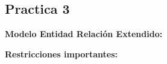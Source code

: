 \documentclass{report}
\begin{document}
	
	
	
	\begin{center}
		\section*{\LARGE{Practica 3}}
	\end{center}
    \begin{center}
        \LARGE{\textbf{Modelo Entidad Relación Extendido:}}\\
    \end{center}
    \normalsize
    

    \begin{center}
        \LARGE{\textbf{Restricciones importantes:}}\\
    \end{center}
    \normalsize

    
    \newpage
    
\printbibliography
  
\end{document}
